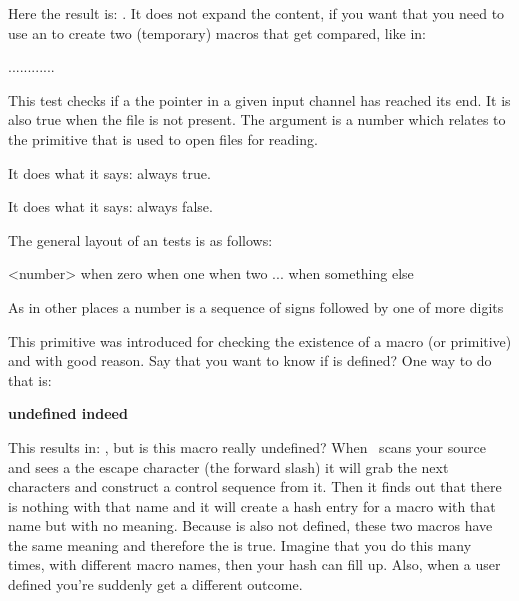 Here the result is: \quotation{\inlinebuffer}. It does not expand the content, if
you want that you need to use an \type {\edef} to create two (temporary) macros
that get compared, like in:

\starttyping[option=TEX]
\edef{}\edef{}\ifx\TempA\TempB ...\else ...\fi
\stoptyping

\stopsectionlevel

\startsectionlevel[title={\tex{ifeof}}]

This test checks if a the pointer in a given input channel has reached its end.
It is also true when the file is not present. The argument is a number which
relates to the \type {\openin} primitive that is used to open files for reading.

\stopsectionlevel

\startsectionlevel[title={\tex{iftrue}}]

It does what it says: always true.

\stopsectionlevel

\startsectionlevel[title={\tex{iffalse}}]

It does what it says: always false.

\stopsectionlevel

\startsectionlevel[title={\tex{ifcase}}]

The general layout of an \type {\ifcase} tests is as follows:

\starttyping[option=TEX]
\ifcase<number>
    when zero
\or
    when one
\or
    when two
\or
    ...
\else
    when something else
\fi
\stoptyping

As in other places a number is a sequence of signs followed by one of more digits

\stopsectionlevel

\stopsectionlevel

\startsectionlevel[title={\ETEX\ primitives}]

\startsectionlevel[title={\tex{ifdefined}}]

This primitive was introduced for checking the existence of a macro (or primitive)
and with good reason. Say that you want to know if \type {\MyMacro} is defined? One
way to do that is:

\startbuffer
\ifx\MyMacro\undefined
    {\bf undefined indeed}
\fi
\stopbuffer

\typebuffer[option=TEX]

This results in: \inlinebuffer , but is this macro really undefined? When \TEX\
scans your source and sees a the escape character (the forward slash) it will
grab the next characters and construct a control sequence from it. Then it finds
out that there is nothing with that name and it will create a hash entry for a
macro with that name but with no meaning. Because \type {\undefined} is also not
defined, these two macros have the same meaning and therefore the \type {\ifx} is
true. Imagine that you do this many times, with different macro names, then your
hash can fill up. Also, when a user defined \type {\undefined} you're suddenly
get a different outcome.

